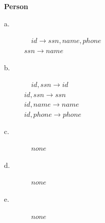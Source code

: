 \documentclass{article}
\begin{document}
\section{}
\textbf{Person\\}
\begin{description}
\item[a.]
$\quad id \rightarrow ssn,name,phone$\\
$ssn \rightarrow name$
\item[b.]
$\quad id,ssn \rightarrow id$\\
$id,ssn \rightarrow ssn$\\
$id,name \rightarrow name$\\
$id,phone \rightarrow phone$
\item[c.]
$\quad none$
\item[d.]
$\quad none$
\item[e.]
$\quad none$
\end{description}
\end{document}
